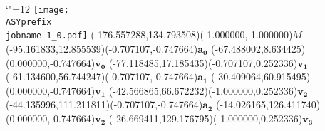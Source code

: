 \setlength{\unitlength}{1pt}
\makeatletter%
\let\ASYencoding\f@encoding%
\let\ASYfamily\f@family%
\let\ASYseries\f@series%
\let\ASYshape\f@shape%
\makeatother%
{\catcode`"=12%
\texttt{[image: \\ASYprefix\\jobname-1\_0.pdf]}%
}%
\color{ASYcolor}
\fontsize{12.000000}{14.400000}\selectfont
\usefont{\ASYencoding}{\ASYfamily}{\ASYseries}{\ASYshape}%
\ASYalign(-176.557288,134.793508)(-1.000000,-1.000000){$M$}%
\color{ASYcolor}
\fontsize{12.000000}{14.400000}\selectfont
\ASYalign(-95.161833,12.855539)(-0.707107,-0.747664){$\mathbf{a_0}$}%
\color{ASYcolor}
\fontsize{12.000000}{14.400000}\selectfont
\ASYalign(-67.488002,8.634425)(0.000000,-0.747664){$\mathbf{v_0}$}%
\color{ASYcolor}
\fontsize{12.000000}{14.400000}\selectfont
\ASYalign(-77.118485,17.185435)(-0.707107,0.252336){$\mathbf{v_1}$}%
\color{ASYcolor}
\fontsize{12.000000}{14.400000}\selectfont
\ASYalign(-61.134600,56.744247)(-0.707107,-0.747664){$\mathbf{a_1}$}%
\color{ASYcolor}
\fontsize{12.000000}{14.400000}\selectfont
\ASYalign(-30.409064,60.915495)(0.000000,-0.747664){$\mathbf{v_1}$}%
\color{ASYcolor}
\fontsize{12.000000}{14.400000}\selectfont
\ASYalign(-42.566865,66.672232)(-1.000000,0.252336){$\mathbf{v_2}$}%
\color{ASYcolor}
\fontsize{12.000000}{14.400000}\selectfont
\ASYalign(-44.135996,111.211811)(-0.707107,-0.747664){$\mathbf{a_2}$}%
\color{ASYcolor}
\fontsize{12.000000}{14.400000}\selectfont
\ASYalign(-14.026165,126.411740)(0.000000,-0.747664){$\mathbf{v_2}$}%
\color{ASYcolor}
\fontsize{12.000000}{14.400000}\selectfont
\ASYalign(-26.669411,129.176795)(-1.000000,0.252336){$\mathbf{v_3}$}%

